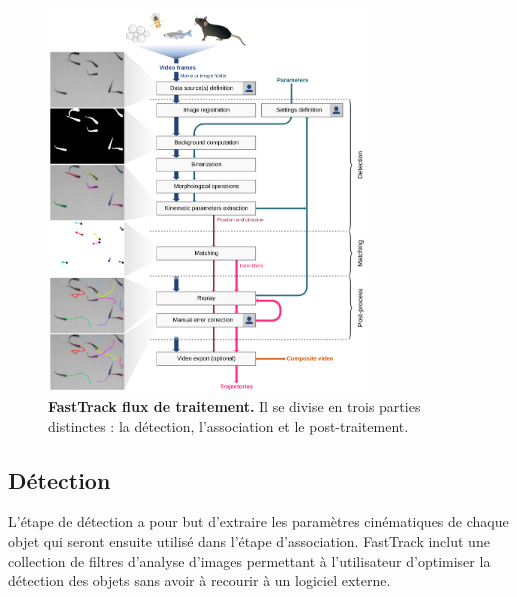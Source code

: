 	\begin{figure}[h]
    \centering
    \includegraphics[width=0.75\textwidth]{part_1/assets/Figure_1.png}    
    \caption{\textbf{FastTrack flux de traitement.} Il se divise en trois parties distinctes : la détection, l'association et le post-traitement.}
    \label{part_1:fig_1}
    \end{figure}
	
	
		\subsection{Détection}
		
		L'étape de détection a pour but d'extraire les paramètres cinématiques de chaque objet qui seront ensuite utilisé dans l'étape d'association. FastTrack inclut une collection de filtres d'analyse d'images permettant à l'utilisateur d'optimiser la détection des objets sans avoir à recourir à un logiciel externe.
		
		
